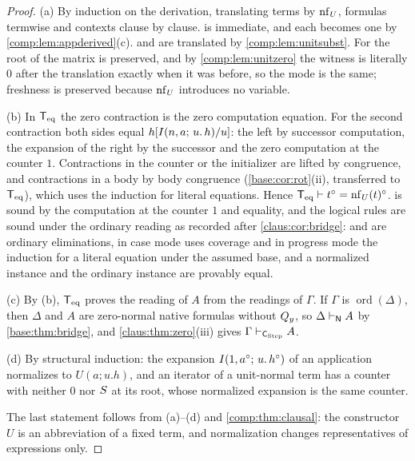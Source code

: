 \begin{proof}
(a) By induction on the derivation, translating terms by $\operatorname{nf}_U$, formulas
termwise and contexts clause by clause.  is immediate, and
each  becomes one  by
\cref{comp:lem:appderived}(c).  and  are
translated by \cref{comp:lem:unitsubst}. For  the root of the
matrix is preserved, and by \cref{comp:lem:unitzero} the witness is
literally $0$ after the translation exactly when it was before, so the mode
is the same; freshness is preserved because $\operatorname{nf}_U$ introduces no variable.

(b) In $\mathsf{T}_{\mathrm{eq}}$ the zero contraction is the zero computation equation. For
the second contraction both sides equal
$h[I(n,a;\,u.\,h)/u]$: the left by successor computation, the
expansion of the right by the successor and the zero computation at the
counter $1$. Contractions in the counter or the initializer are lifted by
congruence, and contractions in a body by body congruence
(\cref{base:cor:rot}(ii), transferred to $\mathsf{T}_{\mathrm{eq}}$), which uses the induction for
literal equations. Hence $\mathsf{T}_{\mathrm{eq}}\vdash t^{\circ}=\operatorname{nf}_U(t)^{\circ}$.
 is sound by the computation at the counter $1$ and equality,
and the logical rules are sound under the ordinary reading as recorded
after \cref{claus:cor:bridge}:  and  are
ordinary eliminations,  in case mode uses coverage and in
progress mode the induction for a literal equation under the assumed base,
and a normalized instance and the ordinary instance are provably equal.

(c) By (b), $\mathsf{T}_{\mathrm{eq}}$ proves the reading of $A$ from the readings of $\Gamma$.
If $\Gamma$ is $\operatorname{ord}(\Delta)$, then $\Delta$ and $A$ are
zero-normal native formulas without $Q_{y}$, so
$\Delta\vdash_{\mathsf{N}}A$ by \cref{base:thm:bridge}, and
\cref{claus:thm:zero}(iii) gives
$\Gamma\vdash_{\mathsf{C}_{\mathrm{Step}}}A$.

(d) By structural induction: the expansion $I(1,a^{\circ};\,u.\,h^{\circ})$
of an application normalizes to $U(a;u.h)$, and an iterator of a
unit-normal term has a counter with neither $0$ nor $S$ at its root,
whose normalized expansion is the same counter.

The last statement follows from (a)--(d) and
\cref{comp:thm:clausal}: the constructor $U$ is an abbreviation of a
fixed term, and normalization changes representatives of expressions only.
\end{proof}

